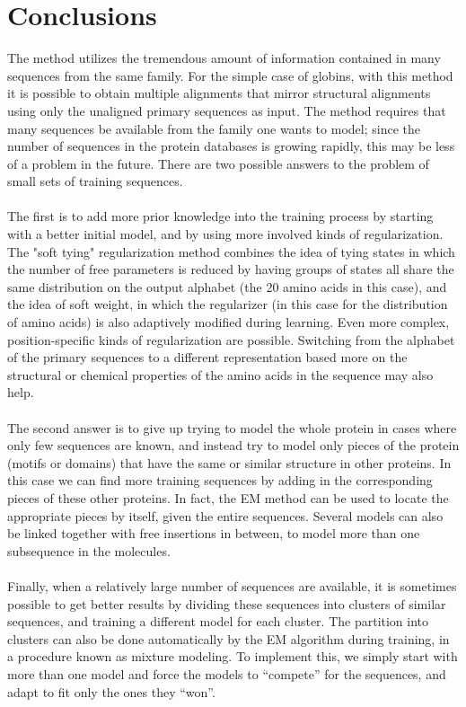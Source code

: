 \section{Conclusions}
The method utilizes the tremendous amount of information contained in many sequences from the same family. 
For the simple case of globins, with this method it is possible to obtain multiple alignments that mirror structural alignments using only the unaligned primary sequences as input. 
The method requires that many sequences be available from the family one wants to model; since the number of sequences in the protein databases is growing rapidly, this may be less of a problem in the future.
There are two possible answers to the problem of small sets of training sequences. 
\\
\\
\noindent
The first is to add more prior knowledge into the training process by starting with a better initial model, and by using more involved kinds of regularization. 
The "soft tying" regularization method combines the idea of tying states in which the number of free parameters is reduced by having groups of states all share the same distribution on the output alphabet (the 20 amino acids in this case), and the idea of soft weight, in which the regularizer (in this case for the distribution of amino acids) is also adaptively modified during learning. 
Even more complex, position-specific kinds of regularization are possible. 
Switching from the alphabet of the primary sequences to a different representation based more on the structural or chemical properties of the amino acids in the sequence may also help.
\\
\\
\noindent
The second answer is to give up trying to model the whole protein in cases where only few sequences are known, and instead try to model only pieces of the protein (motifs or domains) that have the same or similar structure in other proteins. In this case we can find more training sequences by adding in the corresponding pieces of these other proteins. In fact, the EM method can be used to locate the appropriate pieces by itself, given the entire sequences. Several models can also be linked together with free insertions in between, to model more than one subsequence in the molecules.
\\
\\
\noindent
Finally, when a relatively large number of sequences are available, it is sometimes possible to get better results by dividing these sequences into clusters of similar sequences, and training a different model for each cluster. 
The partition into clusters can also be done automatically by the EM algorithm during training, in a procedure known as mixture modeling. To implement this, we simply start with more than one model and force the models to “compete” for the sequences, and adapt to fit only the ones they “won”. 



